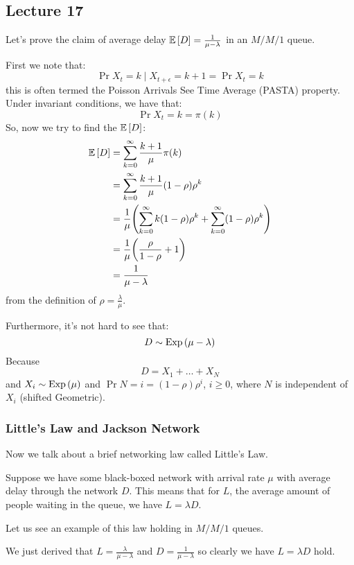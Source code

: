 \subsection{Lecture 17}

Let's prove the claim of average delay $\mathbb{E}\left[ D \right] = \frac{1}{\mu - \lambda}$ in an $M/M/1$ queue.

\begin{proof*}
    First we note that:
    \[ \Pr{X_t = k \mid X_{t + \epsilon} = k + 1} = \Pr{X_t = k} \]
    this is often termed the Poisson Arrivals See Time Average (PASTA) property.
    Under invariant conditions, we have that:
    \[ \Pr{X_t = k} = \pi(k) \]
    So, now we try to find the $\mathbb{E}\left[ D \right]$:
    \begin{align*}
        \mathbb{E}\left[ D \right] &= \sum_{k = 0}^{\infty} \frac{k + 1}{\mu} \pi(k) \\
        &= \sum_{k = 0}^{\infty} \frac{k + 1}{\mu} (1 - \rho) \rho^k \\
        &= \frac{1}{\mu} \qty(\sum_{k = 0}^{\infty} k (1 - \rho) \rho^k + \sum_{k = 0}^{\infty} (1 - \rho) \rho^k)\\
        &= \frac{1}{\mu} \qty(\frac{\rho}{1 - \rho} + 1)\\
        &= \frac{1}{\mu - \lambda}
    \end{align*}
    from the definition of $\rho = \frac{\lambda}{\mu}$.
\end{proof*}

Furthermore, it's not hard to see that:
\[ D \sim \text{Exp}\left( \mu - \lambda \right) \]
Because
\[ D = X_1 + \dots + X_N \]
and $X_i \sim \text{Exp}\left( \mu \right)$ and $\Pr{N = i} = (1- \rho)\rho^i$, $i \geq 0$, where $N$ is independent of $X_i$ (shifted Geometric).

\subsubsection{Little's Law and Jackson Network}
Now we talk about a brief networking law called Little's Law.
\begin{theorem}
    Suppose we have some black-boxed network with arrival rate $\mu$ with average delay through the network $D$. This means that for $L$,
    the average amount of people waiting in the queue, we have $L = \lambda D$.
\end{theorem}

Let us see an example of this law holding in $M/M/1$ queues.
\begin{example}
    We just derived that $L = \frac{\lambda}{\mu - \lambda}$ and $D = \frac{1}{\mu - \lambda}$ so clearly we have $L = \lambda D$ hold.
\end{example}

